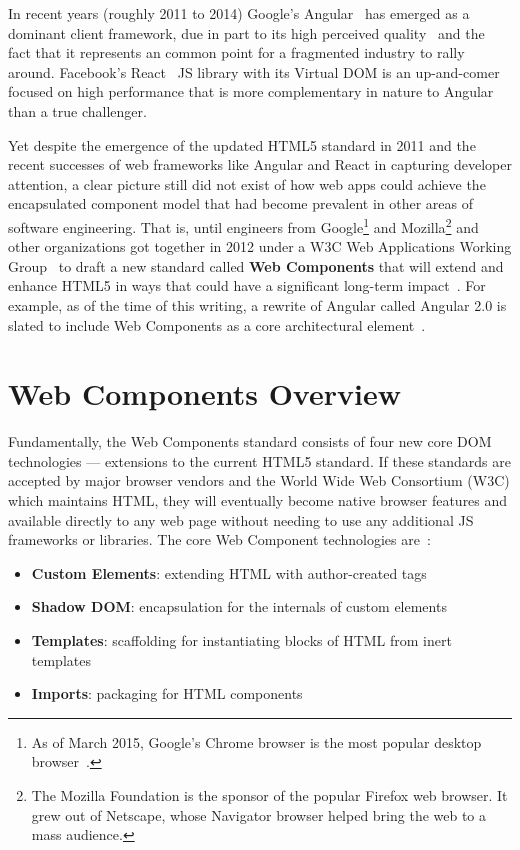 In recent years (roughly 2011 to 2014) Google's Angular~\cite{googledevelopers2015-b}
has emerged as a dominant client framework, 
due in part to its high perceived quality~\cite{dickey2014} and the fact that it represents an common point for a fragmented industry to rally around.
Facebook's React~\cite{reactcontributors2015}
JS library with its Virtual DOM is an up-and-comer focused on high performance that is more complementary in nature to Angular than a true challenger.

Yet despite the emergence of the updated HTML5 standard in 2011 and the recent successes of web frameworks like Angular and React in capturing developer attention, 
a clear picture still did not exist of how web apps could achieve the encapsulated component model that had become prevalent in other areas of software engineering.
That is, until engineers from Google\footnote{
As of March 2015, Google's Chrome browser is the most popular desktop browser~\cite{zachte2015}.}
and Mozilla\footnote{
The Mozilla Foundation is the sponsor of the popular Firefox web browser. It grew out of Netscape, whose Navigator browser helped bring the web to a mass audience.}
and other organizations got together in 2012 under a W3C Web Applications Working Group~\cite{w3c2015} 
to draft a new standard called \textbf{Web Components} that will extend and enhance HTML5 in ways that could have a significant long-term impact~\cite{yveslafon2015}. 
For example, as of the time of this writing, a rewrite of Angular called Angular 2.0 is slated to include Web Components as a core architectural element~\cite{santiagoesteva2015}.

\section{Web Components Overview}
Fundamentally, the Web Components standard consists of four new core DOM technologies --- extensions to the current HTML5 standard.
If these standards are accepted by major browser vendors and the World Wide Web Consortium (W3C)
which maintains HTML, 
they will eventually become native browser features and available directly to any web page without needing to use any additional JS frameworks or libraries. 
The core Web Component technologies are~\cite{penades2015}:
\begin{itemize}
\item
\textbf{Custom Elements}: extending HTML with author-created tags
\item
\textbf{Shadow DOM}: encapsulation for the internals of custom elements
\item
\textbf{Templates}: scaffolding for instantiating blocks of HTML from inert templates
\item
\textbf{Imports}: packaging for HTML components
\end{itemize}

